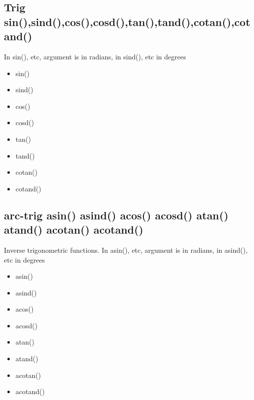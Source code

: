 {\subsection{Trig \textcolor{VioletRed}{sin}(),\textcolor{VioletRed}{sind}(),\textcolor{VioletRed}{cos}(),\textcolor{VioletRed}{cosd}(),\textcolor{VioletRed}{tan}(),\textcolor{VioletRed}{tand}(),\textcolor{VioletRed}{cotan}(),\textcolor{VioletRed}{cotand}()} 
\label{trigfu} 
In \textcolor{VioletRed}{sin}(), etc,  argument is in radians, in \textcolor{VioletRed}{sind}(), etc in degrees 
\begin{itemize} 
\item \textcolor{VioletRed}{sin}() 
\item \textcolor{VioletRed}{sind}() 
\item \textcolor{VioletRed}{cos}() 
\item \textcolor{VioletRed}{cosd}() 
\item \textcolor{VioletRed}{tan}() 
\item \textcolor{VioletRed}{tand}() 
\item \textcolor{VioletRed}{cotan}() 
\item \textcolor{VioletRed}{cotand}() 
\end{itemize} 
\subsection{arc-trig \textcolor{VioletRed}{asin}() \textcolor{VioletRed}{asind}() \textcolor{VioletRed}{acos}() \textcolor{VioletRed}{acosd}() \textcolor{VioletRed}{atan}() \textcolor{VioletRed}{atand}() \textcolor{VioletRed}{acotan}() \textcolor{VioletRed}{acotand}()} 
\label{atrigfu} 
Inverse trigonometric functions. In \textcolor{VioletRed}{asin}(), etc,  argument is in radians, in \textcolor{VioletRed}{asind}(), etc in degrees 
\begin{itemize} 
\item \textcolor{VioletRed}{asin}() 
\item \textcolor{VioletRed}{asind}() 
\item \textcolor{VioletRed}{acos}() 
\item \textcolor{VioletRed}{acosd}() 
\item \textcolor{VioletRed}{atan}() 
\item \textcolor{VioletRed}{atand}() 
\item \textcolor{VioletRed}{acotan}() 
\item \textcolor{VioletRed}{acotand}() 
\end{itemize} 
}
